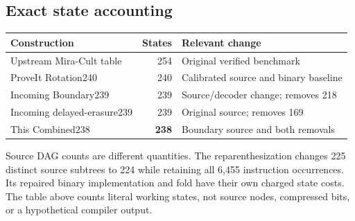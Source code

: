 \subsection{Exact state accounting}

\begin{center}
\begin{tabular}{@{}L{0.43\textwidth}rL{0.38\textwidth}@{}}
\toprule
Construction & States & Relevant change\\
\midrule
Upstream Mira-Cult table & 254 & Original verified benchmark\\
ProveIt Rotation240 & 240 & Calibrated source and binary baseline\\
Incoming Boundary239 & 239 & Source/decoder change; removes 218\\
Incoming delayed-erasure239 & 239 & Original source; removes 169\\
This Combined238 & \textbf{238} & Boundary source and both removals\\
\bottomrule
\end{tabular}
\end{center}

Source DAG counts are different quantities. The reparenthesization
changes 225 distinct source subtrees to 224 while retaining all 6,455
instruction occurrences. Its repaired binary implementation and fold
have their own charged state costs. The table above counts literal
working states, not source nodes, compressed bits, or a hypothetical
compiler output.
